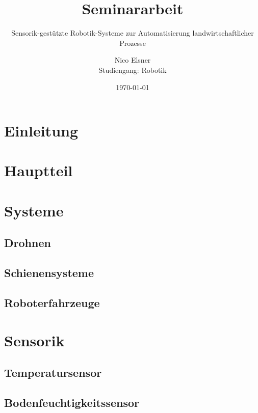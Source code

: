 \documentclass[a4paper,
			   11pt,
			   ngerman, 
			   ]{scrreprt}
\begin{document}
	\title{Seminararbeit}
	\subtitle{Sensorik-gestützte Robotik-Systeme zur Automatisierung landwirtschaftlicher Prozesse}
	\author{Nico Elsner\\
	Studiengang: Robotik}
	\date{\today}
	\maketitle
	\tableofcontents
	\thispagestyle{empty}
	\newpage
	\setcounter{page}{1}
	\chapter{Einleitung}
	
	\chapter{Hauptteil}
	
	
	\chapter{Systeme}
		\section{Drohnen}
		
		\section{Schienensysteme}
		
		\section{Roboterfahrzeuge}
		

	\chapter{Sensorik}
	
		\section{Temperatursensor}
		
		\section{Bodenfeuchtigkeitssensor}
		
\end{document}

